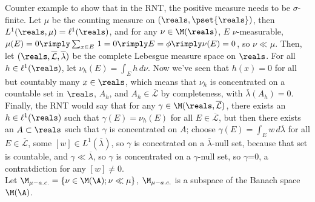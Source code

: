 




Counter example to show that in the RNT, the positive measure needs to be $\sigma$-finite. Let $\mu$ be the counting measure on $(\reals, \pset{\reals})$, then $L^1(\reals, \mu) = \ell^1(\reals)$, and for any $\nu \in \M(\reals)$, $E$ $\nu$-measurable, $\mu(E) = 0 \rimply \sum_{x \in E} \, 1 = 0 \rimply E = \phi \rimply \nu(E) = 0$, so $\nu \ll \mu$. Then, let $(\reals, \overline{\mathcal{L}}, \overline{\lambda})$ be the complete Lebesgue measure space on $\reals$. For all $h \in \ell^1(\reals)$, let $\nu_h(E) = \int_E h \, d\nu$. Now we've seen that $h(x) = 0$ for all but countably many $x \in \reals$, which means that $\nu_h$ is concentrated on a countable set in $\reals$, $A_h$, and $A_h \in \overline{\mathcal{L}}$ by completeness, with $\overline{\lambda}(A_h) = 0$. Finally, the RNT would say that for any $\gamma \in \M(\reals, \overline{\mathcal{L}})$, there exists an $h \in \ell^1(\reals)$ such that $\gamma(E) = \nu_h(E)$ for all $E \in \overline{\mathcal{L}}$, but then there exists an $A \subset \reals$ such that $\gamma$ is concentrated on $A$; choose $\gamma(E) = \int_E w \, d\overline{\lambda}$ for all $E \in \overline{\mathcal{L}}$, some $[w] \in L^1(\overline{\lambda})$, so $\gamma$ is concetrated on a $\overline{\lambda}$-null set, because that set is countable, and $\gamma \ll \overline{\lambda}$, so $\gamma$ is concentrated on a $\gamma$-null set, so $\gamma$=0, a contratdiction for any $[w] \not = 0$. \\





Let $\M_{\mu-a.c.} = \{ \nu \in \M(\A); \nu \ll \mu \}$, $\M_{\mu-a.c.}$ is a subspace of the Banach space $\M(\A)$.\\

